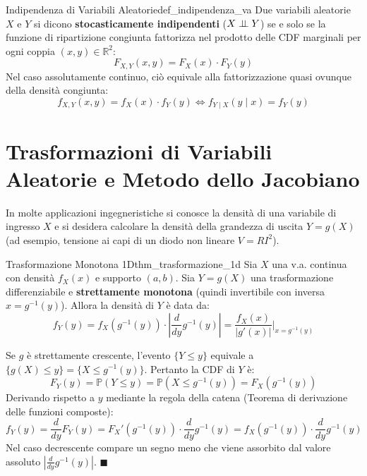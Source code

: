 \begin{definizione}{Indipendenza di Variabili Aleatorie}{def_indipendenza_va}
Due variabili aleatorie $X$ e $Y$ si dicono \textbf{stocasticamente indipendenti} ($X \perp\!\!\!\perp Y$) se e solo se la funzione di ripartizione congiunta fattorizza nel prodotto delle CDF marginali per ogni coppia $(x, y) \in \mathbb{R}^2$:
\begin{equation}
    F_{X,Y}(x, y) = F_X(x) \cdot F_Y(y)
\end{equation}
Nel caso assolutamente continuo, ciò equivale alla fattorizzazione quasi ovunque della densità congiunta:
\begin{equation}
    f_{X,Y}(x, y) = f_X(x) \cdot f_Y(y) \iff f_{Y \mid X}(y \mid x) = f_Y(y)
\end{equation}
\end{definizione}

\section{Trasformazioni di Variabili Aleatorie e Metodo dello Jacobiano}
\label{sec:trasformazioni_va}

In molte applicazioni ingegneristiche si conosce la densità di una variabile di ingresso $X$ e si desidera calcolare la densità della grandezza di uscita $Y = g(X)$ (ad esempio, tensione ai capi di un diodo non lineare $V = R I^2$).

\begin{teorema}{Trasformazione Monotona 1D}{thm_trasformazione_1d}
Sia $X$ una v.a. continua con densità $f_X(x)$ e supporto $(a, b)$. Sia $Y = g(X)$ una trasformazione differenziabile e \textbf{strettamente monotona} (quindi invertibile con inversa $x = g^{-1}(y)$). Allora la densità di $Y$ è data da:
\begin{equation}
    f_Y(y) = f_X(g^{-1}(y)) \cdot \left| \frac{d}{dy} g^{-1}(y) \right| = \frac{f_X(x)}{|g'(x)|} \Bigg|_{x = g^{-1}(y)}
\end{equation}
\end{teorema}

\begin{dimostrazione}
Se $g$ è strettamente crescente, l'evento $\{Y \le y\}$ equivale a $\{g(X) \le y\} = \{X \le g^{-1}(y)\}$.
Pertanto la CDF di $Y$ è:
\begin{equation}
    F_Y(y) = \mathbb{P}(Y \le y) = \mathbb{P}(X \le g^{-1}(y)) = F_X(g^{-1}(y))
\end{equation}
Derivando rispetto a $y$ mediante la regola della catena (Teorema di derivazione delle funzioni composte):
\begin{equation}
    f_Y(y) = \frac{d}{dy} F_Y(y) = F_X'(g^{-1}(y)) \cdot \frac{d}{dy} g^{-1}(y) = f_X(g^{-1}(y)) \cdot \frac{d}{dy} g^{-1}(y)
\end{equation}
Nel caso decrescente compare un segno meno che viene assorbito dal valore assoluto $|\frac{d}{dy}g^{-1}(y)|$. $\blacksquare$
\end{dimostrazione}

